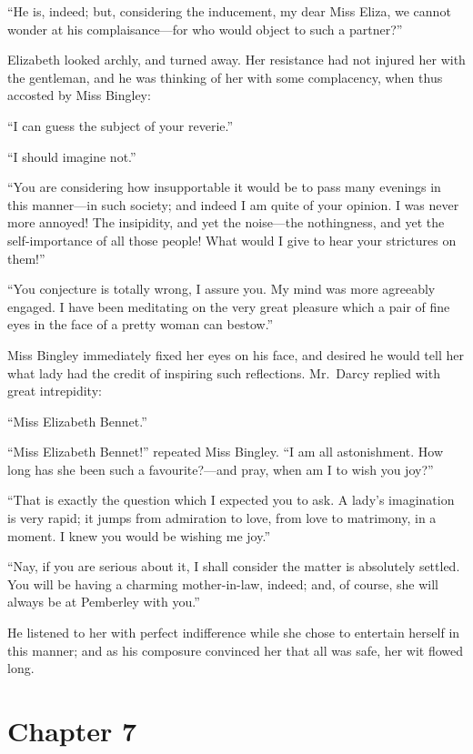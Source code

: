 ``He is, indeed; but, considering the inducement, my dear Miss
Eliza, we cannot wonder at his complaisance---for who would
object to such a partner?''

Elizabeth looked archly, and turned away.  Her resistance had
not injured her with the gentleman, and he was thinking of her
with some complacency, when thus accosted by Miss Bingley:

``I can guess the subject of your reverie.''

``I should imagine not.''

``You are considering how insupportable it would be to pass many
evenings in this manner---in such society; and indeed I am quite
of your opinion.  I was never more annoyed!  The insipidity, and
yet the noise---the nothingness, and yet the self-importance of all
those people!  What would I give to hear your strictures on them!''

``You conjecture is totally wrong, I assure you.  My mind was
more agreeably engaged.  I have been meditating on the very
great pleasure which a pair of fine eyes in the face of a pretty
woman can bestow.''

Miss Bingley immediately fixed her eyes on his face, and desired
he would tell her what lady had the credit of inspiring such
reflections.  Mr.\ Darcy replied with great intrepidity:

``Miss Elizabeth Bennet.''

``Miss Elizabeth Bennet!'' repeated Miss Bingley.  ``I am all
astonishment.  How long has she been such a favourite?---and
pray, when am I to wish you joy?''

``That is exactly the question which I expected you to ask.  A
lady's imagination is very rapid; it jumps from admiration to
love, from love to matrimony, in a moment.  I knew you would
be wishing me joy.''

``Nay, if you are serious about it, I shall consider the matter is
absolutely settled.  You will be having a charming mother-in-law,
indeed; and, of course, she will always be at Pemberley with you.''

He listened to her with perfect indifference while she chose to
entertain herself in this manner; and as his composure convinced
her that all was safe, her wit flowed long.



\chapter{Chapter 7}



